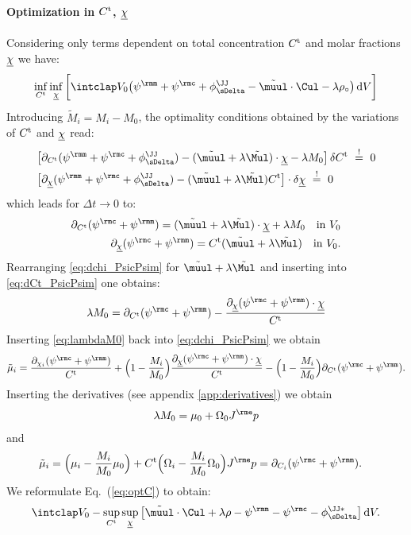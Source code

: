 \paragraph{Optimization in $C^{\rm t}$, $\underline{\chi}$} \label{sec:optC} %
  Considering only terms dependent on total concentration $C^{\rm t}$ and molar fractions $\underline{\chi}$ we have:
  \begin{align}
    \inf_{\Ct} \inf_{\chiul} \bigg[ \intVO \big( \psim + \psic + \phiJJDelta - \muultilde \cdot \Cul - \lambda \rho_\circ \big) \dV \bigg]
    \label{eq:optC}
  \end{align} 
  Introducing $\tilde M_i=M_i-M_0$, the optimality conditions obtained by the variations of $C^{\rm t}$ and $\underline{\chi}$ read:
  \begin{align}
    & \big[\dCt(\psim+\psic+\phiJJDelta)-(\tilde\muul+\lambda\tilde\Mul)\cdot\chiul-\lambda M_0 \big] \, \delta\Ct \ \stackrel{!}{=} \ 0 \\
    & \big[\dchiul(\psim+\psic+\phiJJDelta)-(\tilde\muul+\lambda\tilde\Mul)\Ct \big] \cdot \delta\chiul \ \stackrel{!}{=} \ 0 
  \end{align}
  which leads for $\Delta t \rightarrow 0$ to:
  \begin{align}
    \dCt(\psic+\psim) = (\tilde\muul+\lambda\Multilde)\cdot\chiul + \lambda M_0 \quad \text{in} \ V_0 \label{eq:dCt_PsicPsim} \\
    \dchiul(\psic+\psim) = \Ct(\tilde\muul+\lambda\Multilde) \quad \text{in} \ V_0. \label{eq:dchi_PsicPsim} 
  \end{align}
  Rearranging \cref{eq:dchi_PsicPsim} for $\muultilde+\lambda\Multilde$ and inserting into \cref{eq:dCt_PsicPsim} one obtains:
  \begin{align}
    \lambda M_0 = \dCt(\psic+\psim) - \frac{\dchiul(\psic+\psim)\cdot\chiul}{\Ct} \label{eq:lambdaM0}
  \end{align}
  Inserting \cref{eq:lambdaM0} back into \cref{eq:dchi_PsicPsim} we obtain
  \begin{align}
    \tilde\mu_i = \frac{\partial_{\chii}(\psic+\psim)}{\Ct} + \Big(1-\frac{M_i}{M_0}\Big) \frac{\dchiul(\psic+\psim)\cdot\chiul}{\Ct} - \Big(1-\frac{M_i}{M_0}\Big) \dCt(\psic+\psim).
  \end{align}
  Inserting the derivatives (see appendix \ref{app:derivatives}) we obtain
  \begin{align}
    \lambda M_0 = \mu_0 + \Omeganord_0 \Je p
  \end{align}
  and 
  \begin{align}
    \tilde\mu_i &= \Big(\mu_i-\frac{M_i}{M_0}\mu_0\Big) + \Ct\Big(\Omeganordi-\frac{M_i}{M_0} \Omeganord_0 \Big) \Je p = \dCi(\psic+\psim). 
  \end{align}
  We reformulate Eq.~(\ref{eq:optC}) to obtain:
  \begin{align}
    \intVO -\sup_{\Ct}\sup_{\chiul} \big[ \muultilde\cdot\Cul + \lambda \rho - \psim - \psic - \phiJJDeltas \big]\dV.
  \end{align}










